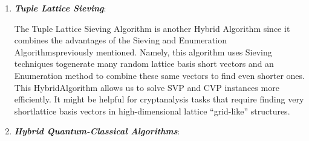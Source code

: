 \documentclass[runningheads]{llncs}
\numberwithin{equation}{section}
\begin{document}
\begin{enumerate}
        \vspace{2ex}
        \item \textbf{\textit{Tuple Lattice Sieving}}:
        \vspace{0.6ex}

        The Tuple Lattice Sieving Algorithm \cite{bai-laarhoven-stehle:tuple-lattice-sieving:2016:06-2024} is another Hybrid Algorithm since it combines the advantages of the Sieving and Enumeration Algorithms\break previously mentioned. Namely, this algorithm uses Sieving techniques to\break generate many random lattice basis short vectors and an Enumeration method to combine these same vectors to find even shorter ones. This Hybrid\break Algorithm allows us to solve SVP and CVP instances more efficiently. It might be helpful for cryptanalysis tasks that require finding very short\break lattice basis vectors in high-dimensional lattice ``grid-like'' structures.
        
        \vspace{2ex}
        \item \textbf{\textit{Hybrid Quantum-Classical Algorithms}}:
        \vspace{0.6ex}


\end{enumerate}
\end{document}
